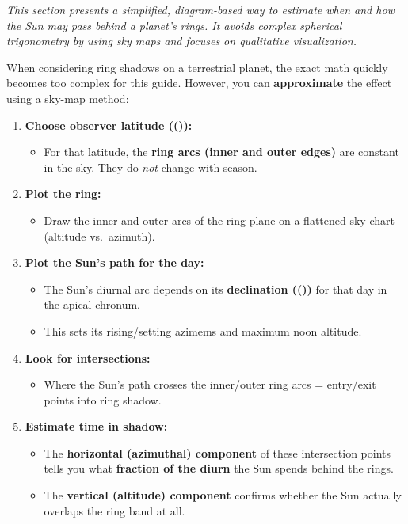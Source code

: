 \documentclass[
  letterpaper,
]{book}
\providecommand{\tightlist}{%
  \setlength{\itemsep}{0pt}\setlength{\parskip}{0pt}}
\begin{document}
\emph{This section presents a simplified, diagram-based way to estimate
when and how the Sun may pass behind a planet's rings. It avoids complex
spherical trigonometry by using sky maps and focuses on qualitative
visualization.}

When considering ring shadows on a terrestrial planet, the exact math
quickly becomes too complex for this guide. However, you can
\textbf{approximate} the effect using a sky-map method:

\begin{enumerate}
\def\labelenumi{\arabic{enumi}.}
\tightlist
\item
  \textbf{Choose observer latitude ((\lambda)):}

  \begin{itemize}
  \tightlist
  \item
    For that latitude, the \textbf{ring arcs (inner and outer edges)}
    are constant in the sky. They do \emph{not} change with season.
  \end{itemize}
\item
  \textbf{Plot the ring:}

  \begin{itemize}
  \tightlist
  \item
    Draw the inner and outer arcs of the ring plane on a flattened sky
    chart (altitude vs.~azimuth).
  \end{itemize}
\item
  \textbf{Plot the Sun's path for the day:}

  \begin{itemize}
  \tightlist
  \item
    The Sun's diurnal arc depends on its \textbf{declination ((\delta))}
    for that day in the apical chronum.\\
  \item
    This sets its rising/setting azimems and maximum noon altitude.
  \end{itemize}
\item
  \textbf{Look for intersections:}

  \begin{itemize}
  \tightlist
  \item
    Where the Sun's path crosses the inner/outer ring arcs = entry/exit
    points into ring shadow.
  \end{itemize}
\item
  \textbf{Estimate time in shadow:}

  \begin{itemize}
  \tightlist
  \item
    The \textbf{horizontal (azimuthal) component} of these intersection
    points tells you what \textbf{fraction of the diurn} the Sun spends
    behind the rings.\\
  \item
    The \textbf{vertical (altitude) component} confirms whether the Sun
    actually overlaps the ring band at all.
  \end{itemize}
\end{enumerate}
\end{document}
